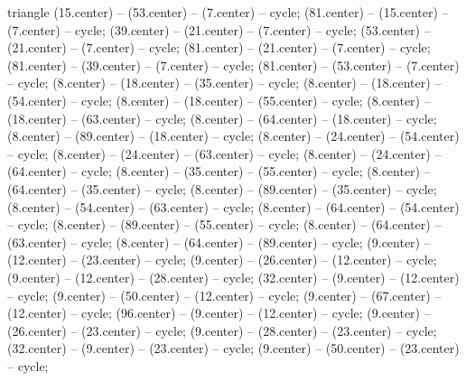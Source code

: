 {\begin{pgfonlayer}{triangle}
 (15.center) -- (53.center) -- (7.center) -- cycle; 
 (81.center) -- (15.center) -- (7.center) -- cycle; 
 (39.center) -- (21.center) -- (7.center) -- cycle; 
 (53.center) -- (21.center) -- (7.center) -- cycle; 
 (81.center) -- (21.center) -- (7.center) -- cycle; 
 (81.center) -- (39.center) -- (7.center) -- cycle; 
 (81.center) -- (53.center) -- (7.center) -- cycle; 
 (8.center) -- (18.center) -- (35.center) -- cycle; 
 (8.center) -- (18.center) -- (54.center) -- cycle; 
 (8.center) -- (18.center) -- (55.center) -- cycle; 
 (8.center) -- (18.center) -- (63.center) -- cycle; 
 (8.center) -- (64.center) -- (18.center) -- cycle; 
 (8.center) -- (89.center) -- (18.center) -- cycle; 
 (8.center) -- (24.center) -- (54.center) -- cycle; 
 (8.center) -- (24.center) -- (63.center) -- cycle; 
 (8.center) -- (24.center) -- (64.center) -- cycle; 
 (8.center) -- (35.center) -- (55.center) -- cycle; 
 (8.center) -- (64.center) -- (35.center) -- cycle; 
 (8.center) -- (89.center) -- (35.center) -- cycle; 
 (8.center) -- (54.center) -- (63.center) -- cycle; 
 (8.center) -- (64.center) -- (54.center) -- cycle; 
 (8.center) -- (89.center) -- (55.center) -- cycle; 
 (8.center) -- (64.center) -- (63.center) -- cycle; 
 (8.center) -- (64.center) -- (89.center) -- cycle; 
 (9.center) -- (12.center) -- (23.center) -- cycle; 
 (9.center) -- (26.center) -- (12.center) -- cycle; 
 (9.center) -- (12.center) -- (28.center) -- cycle; 
 (32.center) -- (9.center) -- (12.center) -- cycle; 
 (9.center) -- (50.center) -- (12.center) -- cycle; 
 (9.center) -- (67.center) -- (12.center) -- cycle; 
 (96.center) -- (9.center) -- (12.center) -- cycle; 
 (9.center) -- (26.center) -- (23.center) -- cycle; 
 (9.center) -- (28.center) -- (23.center) -- cycle; 
 (32.center) -- (9.center) -- (23.center) -- cycle; 
 (9.center) -- (50.center) -- (23.center) -- cycle; 

\end{pgfonlayer}}
